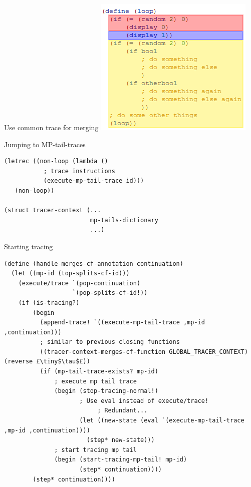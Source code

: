 \documentclass{beamer}
\begin{document}
\begin{frame}[fragile]{Use common trace for merging}
\hspace{2.2cm}
\includegraphics[scale=1]{merging_ex_3.png} 
\end{frame}

\begin{frame}[fragile]{Jumping to MP-tail-traces}
\begin{lstlisting}[basicstyle = \small\ttfamily, escapechar = £]
(letrec ((non-loop (lambda ()
           ; trace instructions
           (execute-mp-tail-trace id)))
   (non-loop))
   
(struct tracer-context (...
                        mp-tails-dictionary
                        ...)
\end{lstlisting}
\end{frame}

\begin{frame}[fragile]{Starting tracing}
\begin{lstlisting}[basicstyle = \tiny\ttfamily, escapechar = £]
(define (handle-merges-cf-annotation continuation)
  (let ((mp-id (top-splits-cf-id)))
    (execute/trace `(pop-continuation)
                   `(pop-splits-cf-id!))
    (if (is-tracing?)
        (begin
          (append-trace! `((execute-mp-tail-trace ,mp-id ,continuation)))
          ; similar to previous closing functions
          ((tracer-context-merges-cf-function GLOBAL_TRACER_CONTEXT) (reverse £\tiny$\tau$£))
          (if (mp-tail-trace-exists? mp-id)
              ; execute mp tail trace
              (begin (stop-tracing-normal!)
                     ; Use eval instead of execute/trace!
                          ; Redundant...
                     (let ((new-state (eval `(execute-mp-tail-trace ,mp-id ,continuation))))
                       (step* new-state)))
              ; start tracing mp tail
              (begin (start-tracing-mp-tail! mp-id)
                     (step* continuation))))
        (step* continuation))))
\end{lstlisting}
\end{frame}
\end{document}
